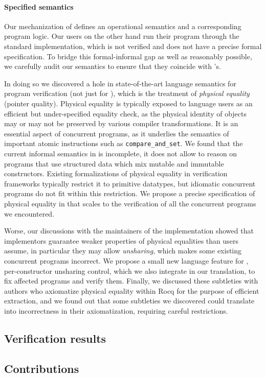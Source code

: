 \paragraph{Specified \OCaml semantics} Our \Iris mechanization of \ZooLang defines an operational semantics and a corresponding program logic. Our users on the other hand run their program through the standard \OCaml implementation, which is not verified and does not have a precise formal specification. To bridge this formal-informal gap as well as reasonably possible, we carefully audit our \ZooLang semantics to ensure that they coincide with \OCaml's.

In doing so we discovered a hole in state-of-the-art language semantics for program verification (not just for \OCaml), which is the treatment of \emph{physical equality} (pointer quality). Physical equality is typically exposed to language users as an efficient but under-specified equality check, as the physical identity of objects may or may not be preserved by various compiler transformations. It is an essential aspect of concurrent programs, as it underlies the semantics of important atomic instructions such as \texttt{compare\_and\_set}. We found that the current informal semantics in \OCaml is incomplete, it does not allow to reason on programs that use structured data which mix mutable and immutable constructors. Existing formalizations of physical equality in verification frameworks typically restrict it to primitive datatypes, but idiomatic concurrent programs do not fit within this restriction. We propose a precise specification of physical equality in \Zoo that scales to the verification of all the concurrent programs we encountered.

Worse, our discussions with the maintainers of the \OCaml implementation showed that implementors guarantee weaker properties of physical equalities than users assume, in particular they may allow \emph{unsharing}, which makes some existing concurrent programs incorrect. We propose a small new language feature for \OCaml, per-constructor unsharing control, which we also integrate in our \ZooLang translation, to fix affected programs and verify them. Finally, we discussed these subtleties with authors who axiomatize physical equality within Rocq for the purpose of efficient extraction, and we found out that some subtleties we discovered could translate into incorrectness in their axiomatization, requiring careful restrictions.

\subsection{Verification results}

\subsection{Contributions}

